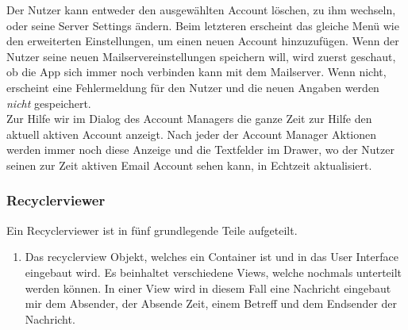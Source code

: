 \documentclass[a4paper,11pt]{article}
\begin{document}
Der Nutzer kann entweder den ausgewählten Account löschen, zu ihm wechseln, oder seine Server Settings ändern. Beim letzteren erscheint das gleiche Menü wie den erweiterten Einstellungen, um einen neuen Account hinzuzufügen. Wenn der Nutzer seine neuen Mailservereinstellungen speichern will, wird zuerst geschaut, ob die App sich immer noch verbinden kann mit dem Mailserver. Wenn nicht, erscheint eine Fehlermeldung für den Nutzer und die neuen Angaben werden \textit{nicht} gespeichert.\\

Zur Hilfe wir im Dialog des Account Managers die ganze Zeit zur Hilfe den aktuell aktiven Account anzeigt. Nach jeder der Account Manager Aktionen werden immer noch diese Anzeige und die Textfelder im Drawer, wo der Nutzer seinen zur Zeit aktiven Email Account sehen kann, in Echtzeit aktualisiert.


\subsubsection{Recyclerviewer}

Ein Recyclerviewer ist in fünf grundlegende Teile aufgeteilt. 

\begin{enumerate}

    \item Das recyclerview Objekt, welches ein Container ist und in das User Interface eingebaut wird. 
Es beinhaltet verschiedene Views, welche nochmals unterteilt werden können. In einer View wird in diesem 
Fall eine Nachricht eingebaut mir dem Absender, der Absende Zeit, einem Betreff und dem Endsender der Nachricht. 

\end{enumerate}

\end{document}
